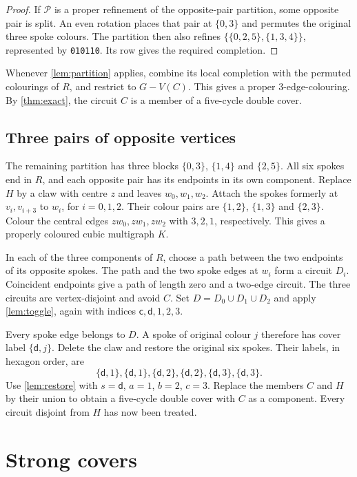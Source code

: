 \documentclass[justified,notoc,twoside,nobib,nofonts]{tufte-handout}
\newcommand{\word}[1]{\texttt{#1}}
\begin{document}
\begin{proof}
If $\mathcal P$ is a proper refinement of the opposite-pair
partition, some opposite pair is split. An even rotation places that
pair at $\{0,3\}$ and permutes the original three spoke colours.
The partition then also refines
$\{\{0,2,5\},\{1,3,4\}\}$, represented by \word{010110}.
Its row gives the required completion.
\end{proof}

Whenever \cref{lem:partition} applies, combine its local completion
with the permuted colourings of $R$, and restrict to $G-V(C)$.
This gives a proper 3-edge-colouring. By \cref{thm:exact}, the
circuit $C$ is a member of a five-cycle double cover.

\subsection{Three pairs of opposite vertices}

The remaining partition has three blocks
$\{0,3\}$, $\{1,4\}$ and $\{2,5\}$. All six spokes end in $R$,
and each opposite pair has its endpoints in its own component.
Replace $H$ by a claw with centre $z$ and leaves $w_0,w_1,w_2$.
Attach the spokes formerly at $v_i,v_{i+3}$ to $w_i$, for $i=0,1,2$.
Their colour pairs are $\{1,2\}$, $\{1,3\}$ and $\{2,3\}$.
Colour the central edges $zw_0,zw_1,zw_2$ with $3,2,1$,
respectively. This gives a properly coloured cubic multigraph $K$.

In each of the three components of $R$, choose a path between the
two endpoints of its opposite spokes. The path and the two spoke
edges at $w_i$ form a circuit $D_i$. Coincident endpoints give a
path of length zero and a two-edge circuit. The three circuits are
vertex-disjoint and avoid $C$. Set $D=D_0\cup D_1\cup D_2$ and
apply \cref{lem:toggle}, again with indices
$\mathsf c,\mathsf d,1,2,3$.

Every spoke edge belongs to $D$. A spoke of original colour $j$
therefore has cover label $\{\mathsf d,j\}$. Delete the claw and
restore the original six spokes. Their labels, in hexagon order, are
\[
 \{\mathsf d,1\},\{\mathsf d,1\},
 \{\mathsf d,2\},\{\mathsf d,2\},
 \{\mathsf d,3\},\{\mathsf d,3\}.
\]
Use \cref{lem:restore} with $s=\mathsf d$, $a=1$, $b=2$, $c=3$.
Replace the members $C$ and $H$ by their union to obtain a five-cycle
double cover with $C$ as a component. Every circuit
disjoint from $H$ has now been treated.

\newpage
\section{Strong covers}\label{sec:conclusion}
\end{document}
